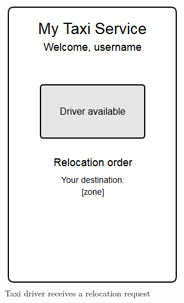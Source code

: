 \begin{figure}
\centering
\includegraphics{tex-images/ui-driver-relocation}
\caption{Taxi driver receives a relocation request}
\end{figure}

\cleardoublepage
